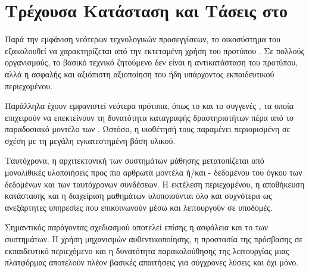 \section{Τρέχουσα Κατάσταση και Τάσεις στο }

Παρά την εμφάνιση νεότερων τεχνολογικών προσεγγίσεων, το οικοσύστημα του  εξακολουθεί να
χαρακτηρίζεται από την εκτεταμένη χρήση του προτύπου . Σε πολλούς οργανισμούς, το βασικό τεχνικό
ζητούμενο δεν είναι η αντικατάσταση του προτύπου, αλλά η ασφαλής και αξιόπιστη αξιοποίηση του ήδη υπάρχοντος
εκπαιδευτικού περιεχομένου.

Παράλληλα έχουν εμφανιστεί νεότερα πρότυπα, όπως το  και το συγγενές , τα οποία επιχειρούν να
επεκτείνουν τη δυνατότητα καταγραφής δραστηριοτήτων πέρα από το παραδοσιακό μοντέλο των
. Ωστόσο, η υιοθέτησή τους παραμένει περιορισμένη σε σχέση με τη μεγάλη
εγκατεστημένη βάση  υλικού.

Ταυτόχρονα, η αρχιτεκτονική των συστημάτων μάθησης μετατοπίζεται από μονολιθικές υλοποιήσεις προς πιο αρθρωτά
μοντέλα ή/και  - δεδομένου του όγκου των δεδομένων και των ταυτόχρονων συνδέσεων. 
Η εκτέλεση περιεχομένου, η αποθήκευση κατάστασης και η διαχείριση μαθημάτων υλοποιούνται όλο και
συχνότερα ως ανεξάρτητες υπηρεσίες που επικοινωνούν μέσω  και λειτουργούν σε  υποδομές.

Σημαντικός παράγοντας σχεδιασμού αποτελεί επίσης η ασφάλεια και το  των συστημάτων. Η χρήση
μηχανισμών αυθεντικοποίησης, η προστασία της πρόσβασης σε εκπαιδευτικό περιεχόμενο και η δυνατότητα
παρακολούθησης της λειτουργίας μιας πλατφόρμας αποτελούν πλέον βασικές απαιτήσεις για σύγχρονες λύσεις
 και όχι μόνο.